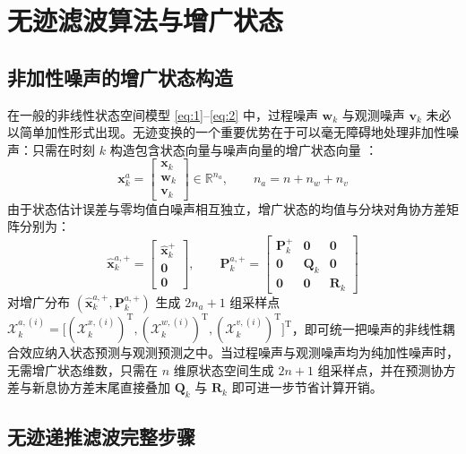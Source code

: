 \section{无迹滤波算法与增广状态}\label{sec:ukf}

\subsection{非加性噪声的增广状态构造}\label{sec:augmented}

在一般的非线性状态空间模型 \eqref{eq:1}–\eqref{eq:2} 中，过程噪声 $\bm{w}_k$ 与观测噪声 $\bm{v}_k$ 未必以简单加性形式出现。无迹变换的一个重要优势在于可以毫无障碍地处理非加性噪声：只需在时刻 $k$ 构造包含状态向量与噪声向量的增广状态向量 \cite{r08}：
\begin{equation}\label{eq:17}
\bm{x}_k^{a} = \begin{bmatrix} \bm{x}_k \\ \bm{w}_k \\ \bm{v}_k \end{bmatrix} \in \mathbb{R}^{n_a}, \qquad n_a = n + n_w + n_v
\end{equation}
由于状态估计误差与零均值白噪声相互独立，增广状态的均值与分块对角协方差矩阵分别为：
\begin{equation}\label{eq:18}
\hat{\bm{x}}_k^{a,+} = \begin{bmatrix} \hat{\bm{x}}_k^{+} \\ \bm{0} \\ \bm{0} \end{bmatrix}, \qquad
\bm{P}_k^{a,+} = \begin{bmatrix} \bm{P}_k^{+} & \bm{0} & \bm{0} \\ \bm{0} & \bm{Q}_k & \bm{0} \\ \bm{0} & \bm{0} & \bm{R}_k \end{bmatrix}
\end{equation}
对增广分布 $(\hat{\bm{x}}_k^{a,+}, \bm{P}_k^{a,+})$ 生成 $2n_a + 1$ 组采样点 $\mathcal{X}_k^{a,(i)} = \bigl[(\mathcal{X}_k^{x,(i)})^{\mathrm{T}}, (\mathcal{X}_k^{w,(i)})^{\mathrm{T}}, (\mathcal{X}_k^{v,(i)})^{\mathrm{T}}\bigr]^{\mathrm{T}}$，即可统一把噪声的非线性耦合效应纳入状态预测与观测预测之中。当过程噪声与观测噪声均为纯加性噪声时，无需增广状态维数，只需在 $n$ 维原状态空间生成 $2n + 1$ 组采样点，并在预测协方差与新息协方差末尾直接叠加 $\bm{Q}_k$ 与 $\bm{R}_k$ 即可进一步节省计算开销。

\subsection{无迹递推滤波完整步骤}\label{sec:ukf-steps}

